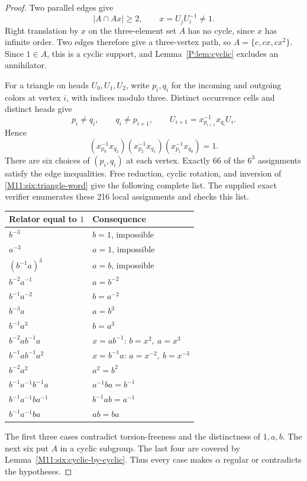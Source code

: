 \documentclass[11pt,a4paper,oneside]{report}
\theoremstyle{definition}
\theoremstyle{remark}
\begin{document}
\begin{proof}
Two parallel edges give
\[
 |A\cap A x|\ge2,\qquad x=U_jU_i^{-1}\ne1.
\]
Right translation by \(x\) on the three-element set \(A\) has no cycle,
since \(x\) has infinite order. Two edges therefore give a three-vertex
path, so \(A=\{c,cx,cx^2\}\). Since \(1\in A\), this is a cyclic support,
and Lemma~\ref{P:lem:cyclic} excludes an annihilator.

For a triangle on heads \(U_0,U_1,U_2\), write \(p_i,q_i\) for the
incoming and outgoing colors at vertex \(i\), with indices modulo three.
Distinct occurrence cells and distinct heads give
\[
 p_i\ne q_i,\qquad q_i\ne p_{i+1},\qquad
 U_{i+1}=x_{p_{i+1}}^{-1}x_{q_i}U_i.
\]
Hence
\begin{equation}\label{M11:six:triangle-word}
 (x_{p_0}^{-1}x_{q_2})
 (x_{p_2}^{-1}x_{q_1})
 (x_{p_1}^{-1}x_{q_0})=1.
\end{equation}
There are six choices of \((p_i,q_i)\) at each vertex. Exactly 66 of the
\(6^3\) assignments satisfy the edge inequalities. Free reduction,
cyclic rotation, and inversion of \eqref{M11:six:triangle-word} give the
following complete list. The supplied exact verifier enumerates these
216 local assignments and checks this list.

\begin{center}
\small
\begin{tabular}{ll}
\hline
Relator equal to \(1\) & Consequence\\
\hline
\(b^{-3}\) & \(b=1\), impossible\\
\(a^{-3}\) & \(a=1\), impossible\\
\((b^{-1}a)^3\) & \(a=b\), impossible\\
\(b^{-2}a^{-1}\) & \(a=b^{-2}\)\\
\(b^{-1}a^{-2}\) & \(b=a^{-2}\)\\
\(b^{-3}a\) & \(a=b^3\)\\
\(b^{-1}a^3\) & \(b=a^3\)\\
\(b^{-2}ab^{-1}a\) & \(x=ab^{-1}\): \(b=x^2,\ a=x^3\)\\
\(b^{-1}ab^{-1}a^2\) & \(x=b^{-1}a\): \(a=x^{-2},\ b=x^{-3}\)\\
\(b^{-2}a^2\) & \(a^2=b^2\)\\
\(b^{-1}a^{-1}b^{-1}a\) & \(a^{-1}ba=b^{-1}\)\\
\(b^{-1}a^{-1}ba^{-1}\) & \(b^{-1}ab=a^{-1}\)\\
\(b^{-1}a^{-1}ba\) & \(ab=ba\)\\
\hline
\end{tabular}
\end{center}

The first three cases contradict torsion-freeness and the distinctness
of \(1,a,b\). The next six put \(A\) in a cyclic subgroup. The last four
are covered by Lemma~\ref{M11:six:cyclic-by-cyclic}. Thus every case makes
\(\alpha\) regular or contradicts the hypotheses.
\end{proof}
\end{document}
